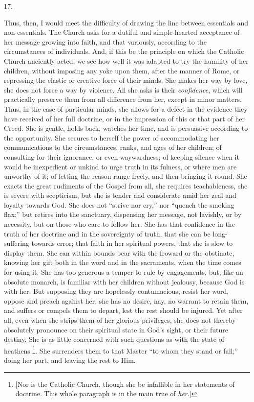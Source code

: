 17.

Thus, then, I would meet the difficulty of drawing the line between
essentials and non-essentials. The Church asks for a dutiful and
simple-hearted acceptance of her message growing into faith, and that
variously, according to the circumstances of individuals. And, if this
be the principle on which the Catholic Church anciently acted, we see
how well it was adapted to try the humility of her children, without
imposing any yoke upon them, after the manner of Rome, or repressing
the elastic or creative force of their minds. She makes her way by
love, she does not force a way by violence. All she asks is their \emph{confidence},
which will practically preserve them from all difference from her,
except in minor matters. Thus, in the case of particular minds, she
allows for a defect in the evidence they have received of her full
doctrine, or in the impression of this or that part of her Creed. She
is gentle, holds back, watches her time, and is persuasive according
to the opportunity. She secures to herself the power of
accommodating her communications to the circumstances, ranks, and ages
of her children; of consulting for their ignorance, or even
waywardness; of keeping silence when it would be inexpedient or unkind
to urge truth in its fulness, or where men are unworthy of it; of
letting the reason range freely, and then bringing it round. She
exacts the great rudiments of the Gospel from all, she requires
teachableness, she is severe with scepticism, but she is tender and
considerate amid her zeal and loyalty towards God. She does not
``strive nor cry,'' nor ``quench the smoking flax;''
but retires into the sanctuary, dispensing her message, not lavishly,
or by necessity, but on those who care to follow her. She has that
confidence in the truth of her doctrine and in the sovereignty of
truth, that she can be long-suffering towards error; that faith in her
spiritual powers, that she is slow to display them. She can within
bounds bear with the froward or the obstinate, knowing her gift both
in the word and in the sacraments, when the time comes for using it.
She has too generous a temper to rule by engagements, but, like an
absolute monarch, is familiar with her children without jealousy,
because God is with her. But supposing they are hopelessly
contumacious, resist her word, oppose and preach against her, she has
no desire, nay, no warrant to retain them, and suffers or compels them
to depart, lest the rest should be injured. Yet after all, even when
she strips them of her glorious privileges, she does not thereby
absolutely pronounce on their spiritual state in God's sight, or their
future destiny. She is as little concerned with such questions as with
the state of heathens \footnote{[Nor is the Catholic Church, though she be
infallible in her statements of doctrine. This whole paragraph is in
the main true of \emph{her}.]}.
She surrenders them to that Master ``to whom they stand or
fall;'' doing her part, and leaving the rest to Him.

